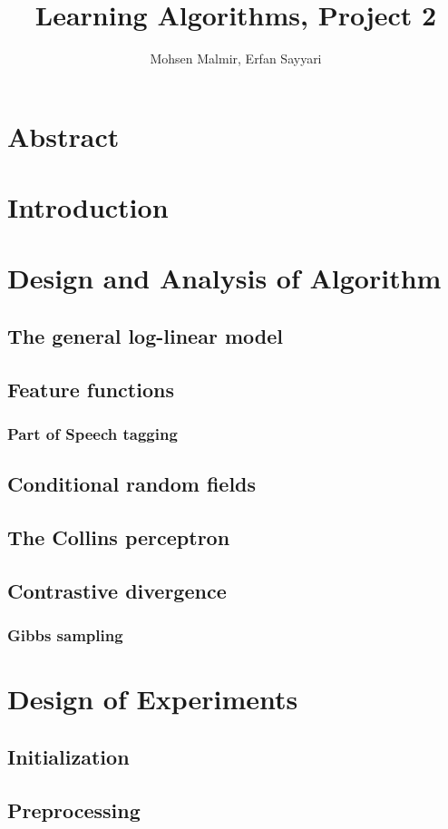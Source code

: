\documentclass[twoside,12pt]{article}
\begin{document}
\title{Learning Algorithms, Project 2}
\author{Mohsen Malmir, Erfan Sayyari}
\maketitle
\section{Abstract}
\section{Introduction}
\section{Design and Analysis of Algorithm}
\subsection{The general log-linear model}
\subsection{Feature functions}
\subsubsection{Part of Speech tagging}
\subsection{Conditional random fields}
\subsection{The Collins perceptron}
\subsection{Contrastive divergence}
\subsubsection{Gibbs sampling}
\section{Design of Experiments}
\subsection{Initialization}
\subsection{Preprocessing}
\end{document}
